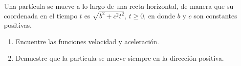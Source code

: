 \item Una partícula se mueve a lo largo de una recta horizontal, de manera que su coordenada en el tiempo $t$ es $\sqrt{b^2 + c^2 t^2}, \, t \ge 0$, en donde $b$ y $c$ son constantes positivas.
\begin{enumerate}
    \item[(a)] Encuentre las funciones velocidad y aceleración.
    \item[(b)] Demuestre que la partícula se mueve siempre en la dirección positiva.
\end{enumerate}
